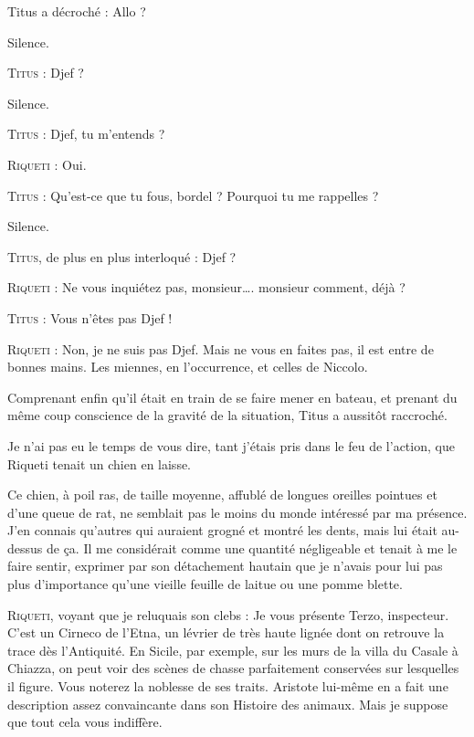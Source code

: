 Titus a décroché : Allo ?

Silence.

\textsc{Titus} : Djef ?

Silence.

\textsc{Titus} : Djef, tu m’entends ?

\textsc{Riqueti} : Oui.

\textsc{Titus} : Qu’est-ce que tu fous, bordel ? Pourquoi tu me rappelles ?

Silence.

\textsc{Titus}, de plus en plus interloqué : Djef ?

\textsc{Riqueti} : Ne vous inquiétez pas, monsieur…. monsieur comment, déjà ?

\textsc{Titus} : Vous n’êtes pas Djef !

\textsc{Riqueti} : Non, je ne suis pas Djef. Mais ne vous en faites pas, il est entre de bonnes mains. Les miennes, en l’occurrence, et celles de Niccolo.

Comprenant enfin qu’il était en train de se faire mener en bateau, et prenant du même coup conscience de la gravité de la situation, Titus a aussitôt raccroché.

Je n’ai pas eu le temps de vous dire, tant j’étais pris dans le feu de l’action, que Riqueti tenait un chien en laisse.

Ce chien, à poil ras, de taille moyenne, affublé de longues oreilles pointues et d’une queue de rat, ne semblait pas le moins du monde intéressé par ma présence. J’en connais qu’autres qui auraient grogné et montré les dents, mais lui était au-dessus de ça. Il me considérait comme une quantité négligeable et tenait à me le faire sentir, exprimer par son détachement hautain que je n’avais pour lui pas plus d’importance qu’une vieille feuille de laitue ou une pomme blette.

\textsc{Riqueti}, voyant que je reluquais son clebs : Je vous présente Terzo, inspecteur. C’est un Cirneco de l’Etna, un lévrier de très haute lignée dont on retrouve la trace dès l’Antiquité. En Sicile, par exemple, sur les murs de la villa du Casale à Chiazza, on peut voir des scènes de chasse parfaitement conservées sur lesquelles il figure. Vous noterez la noblesse de ses traits. Aristote lui-même en a fait une description assez convaincante dans son Histoire des animaux. Mais je suppose que tout cela vous indiffère.


